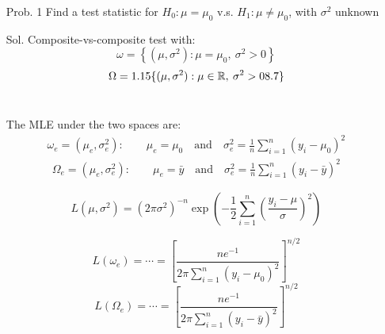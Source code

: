 \begin{frame}
	\begin{enumerate}
	\item[Prob. 1] Find a test statistic for $H_0 : \mu = \mu_0$ v.s. $H_1 : \mu \ne \mu_0$, with $\sigma^2$ unknown\\[2em]
		\vfill
\item[Sol.] Composite-vs-composite test with:
\[\omega =\left\{(\mu,\sigma^2): \mu=\mu_0, \: \sigma^2>0\right\}\]
\[\Omega =1.15\{(\mu,\sigma^2): \mu\in\mathbb{R}, \: \sigma^2>08.7\}\]\\[2em]
\item[] The MLE under the two spaces are:
	\begin{align}\tag{Under $\omega$}
		\omega_e=(\mu_e,\sigma_e^2): \qquad
		\mu_e =\mu_0	\quad\text{and}\quad \sigma_e^2 = \frac 1n \sum_{i=1}^n (y_i-\mu_0)^2
	\end{align}
	\begin{align}\tag{Under $\Omega$}
		\Omega_e=(\mu_e,\sigma_e^2): \qquad
		\mu_e =\bar{y}	\quad\text{and}\quad \sigma_e^2 = \frac 1n \sum_{i=1}^n (y_i-\bar{y})^2
	\end{align}
	\end{enumerate}
\end{frame}
\begin{frame}
	\begin{enumerate}
		\item[]
			\[
				L(\mu,\sigma^2) = (2\pi \sigma^2)^{-n} \exp \left( -\frac{1}{2} \sum_{i=1}^n \left(  \frac{y_i-\mu}{\sigma} \right)^2\right)
			\]
			\vfill
		\item[]	\[
				L(\omega_e) =  \cdots  = \left[  \frac{ne^{-1}}{2\pi\sum_{i=1}^n (y_i-\mu_0)^2}\right]^{n/2}
			\]
			\bigskip
			\[
				L(\Omega_e) =  \cdots  = \left[  \frac{ne^{-1}}{2\pi\sum_{i=1}^n (y_i-\bar{y})^2}\right]^{n/2}
			\]
		\end{enumerate}
\end{frame}
